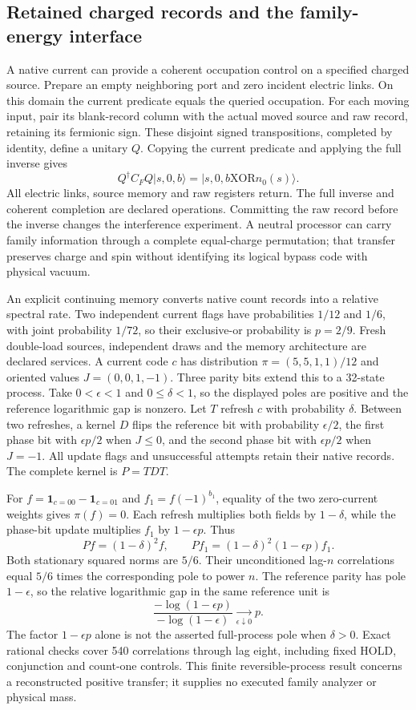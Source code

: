 \subsection{Retained charged records and the family-energy interface}
\label{sec:retained-charged-observer-records}

A native current can provide a coherent occupation control on a specified
charged source. Prepare an empty neighboring port and zero incident electric
links. On this domain the current predicate equals the queried occupation.
For each moving input, pair its blank-record column with the actual moved
source and raw record, retaining its fermionic sign. These disjoint signed
transpositions, completed by identity, define a unitary $Q$. Copying the
current predicate and applying the full inverse gives
\[
 Q^\dagger C_F Q\lvert s,0,b\rangle
 =\lvert s,0,b\mathbin{\mathrm{XOR}}n_0(s)\rangle.
\]
All electric links, source memory and raw registers return. The full inverse
and coherent completion are declared operations. Committing the raw record
before the inverse changes the interference experiment. A neutral processor
can carry family information through a complete equal-charge permutation;
that transfer preserves charge and spin without identifying its logical
bypass code with physical vacuum.

An explicit continuing memory converts native count records into a relative
spectral rate. Two independent current flags have probabilities $1/12$ and
$1/6$, with joint probability $1/72$, so their exclusive-or probability is
$p=2/9$. Fresh double-load sources, independent draws and the memory
architecture are declared services. A current code $c$ has distribution
$\pi=(5,5,1,1)/12$ and oriented values $J=(0,0,1,-1)$. Three parity bits
extend this to a 32-state process. Take $0<\epsilon<1$ and
$0\leq\delta<1$, so the displayed poles are positive and the reference
logarithmic gap is nonzero. Let $T$ refresh $c$ with probability
$\delta$. Between two refreshes, a kernel $D$ flips the reference bit with
probability $\epsilon/2$, the first phase bit with $\epsilon p/2$ when
$J\leq0$, and the second phase bit with $\epsilon p/2$ when $J=-1$.
All update flags and unsuccessful attempts retain their native records.
The complete kernel is $P=TDT$.

For $f=\mathbf1_{c=00}-\mathbf1_{c=01}$ and
$f_1=f(-1)^{b_1}$, equality of the two zero-current weights gives
$\pi(f)=0$. Each refresh multiplies both fields by $1-\delta$, while
the phase-bit update multiplies $f_1$ by $1-\epsilon p$. Thus
\[
 Pf=(1-\delta)^2f,\qquad
 Pf_1=(1-\delta)^2(1-\epsilon p)f_1.
\]
Both stationary squared norms are $5/6$. Their unconditioned lag-$n$
correlations equal $5/6$ times the corresponding pole to power $n$.
The reference parity has pole $1-\epsilon$, so the relative logarithmic
gap in the same reference unit is
\[
 \frac{-\log(1-\epsilon p)}{-\log(1-\epsilon)}
 \xrightarrow[\epsilon\downarrow0]{}p.
\]
The factor $1-\epsilon p$ alone is not the asserted full-process pole
when $\delta>0$. Exact rational checks cover 540 correlations through
lag eight, including fixed HOLD, conjunction and count-one controls.
This finite reversible-process result concerns a reconstructed positive
transfer; it supplies no executed family analyzer or physical mass.


